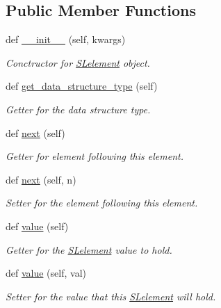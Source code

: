  \subsection*{Public Member Functions}
\begin{DoxyCompactItemize}
\item 
def \hyperlink{classbridges_1_1sl__element_1_1_s_lelement_af95c000aa951fbf1c5912892248389d2}{\+\_\+\+\_\+init\+\_\+\+\_\+} (self, kwargs)
\begin{DoxyCompactList}\small\item\em Conctructor for \hyperlink{classbridges_1_1sl__element_1_1_s_lelement}{S\+Lelement} object. \end{DoxyCompactList}\item 
def \hyperlink{classbridges_1_1sl__element_1_1_s_lelement_aa39835634a95d832d092dd3c057a49cf}{get\+\_\+data\+\_\+structure\+\_\+type} (self)
\begin{DoxyCompactList}\small\item\em Getter for the data structure type. \end{DoxyCompactList}\item 
def \hyperlink{classbridges_1_1sl__element_1_1_s_lelement_acef793fc5e2533fb91795d01904e8b6d}{next} (self)
\begin{DoxyCompactList}\small\item\em Getter for element following this element. \end{DoxyCompactList}\item 
def \hyperlink{classbridges_1_1sl__element_1_1_s_lelement_af7cdff0e4a93e1fbbcb7f92741fe4c7b}{next} (self, n)
\begin{DoxyCompactList}\small\item\em Setter for the element following this element. \end{DoxyCompactList}\item 
def \hyperlink{classbridges_1_1sl__element_1_1_s_lelement_a64ede02c56a4efaaa4c64a245bd01dd0}{value} (self)
\begin{DoxyCompactList}\small\item\em Getter for the \hyperlink{classbridges_1_1sl__element_1_1_s_lelement}{S\+Lelement} value to hold. \end{DoxyCompactList}\item 
def \hyperlink{classbridges_1_1sl__element_1_1_s_lelement_a7653b41a8bc2c8ba7a71f07c8b0b8f3f}{value} (self, val)
\begin{DoxyCompactList}\small\item\em Setter for the value that this \hyperlink{classbridges_1_1sl__element_1_1_s_lelement}{S\+Lelement} will hold. \end{DoxyCompactList}\item 

\end{DoxyCompactItemize}
